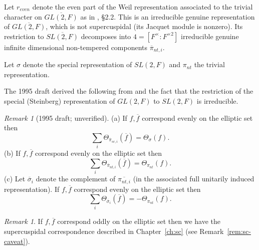 \documentclass[12pt,letterpaper]{book}
\theoremstyle{plain}
\theoremstyle{definition}
\theoremstyle{remark}
\newtheorem{remark}[theorem]{Remark}
\theoremstyle{remark}
\newtheorem{remyy}{Remark}
\begin{document}
Let $r_{even}$ denote the even part of the Weil
representation associated to the trivial character on
$\overline{GL(2,F)}$ as in \cite{Fl}, \S 2.2. This is an
irreducible genuine representation of
$\overline{GL(2,F)}$, which is not supercuspidal (its Jacquet module is
nonzero). Its restriction to
$\overline{SL(2,F)}$ decomposes into $4=[F^\times:F^{\times 2}]$
irreducible genuine infinite dimensional
non-tempered components $\overline{\pi}_{nt,i}$.

Let $\sigma$ denote the special representation of $SL(2,F)$
and $\pi_{nt}$ the trivial representation.

The 1995 draft derived the following from \cite{Fl} and the fact that the
restriction of the special (Steinberg) representation of $GL(2,F)$
to $SL(2,F)$ is irreducible.

\begin{remyy}[1995 draft; unverified] (a) If $f, \overline{f}$ correspond evenly on the elliptic set
then
\[
\sum_i \Theta_{\overline{\pi}_{sc,i}}(\overline{f})
=\Theta_\sigma(f).
\]
(b) If $f,\overline{f}$ correspond evenly on the elliptic set
then
\[
\sum_i \Theta_{\overline{\pi}_{nt,i}}(\overline{f})
=\Theta_{\pi_{nt}}(f).
\]
(c) Let $\overline{\sigma}_i$ denote the complement of
$\overline{\pi_{nt,i}}$ (in the associated full unitarily
induced representation). If $f,\overline{f}$ correspond
evenly on the elliptic set then
\[
\sum_i \Theta_{\overline{\sigma}_{i}}(\overline{f})
=-\Theta_{\pi_{nt}}(f).
\]
\end{remyy}

\begin{remark} If $f,\overline{f}$ correspond oddly on the elliptic set
then we have the supercuspidal
correspondence described in Chapter~\ref{ch:sc} (see Remark~\ref{rem:sc-caveat}).
\end{remark}






\end{document}
